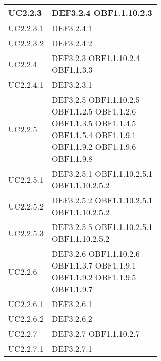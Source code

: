 \documentclass{scalatekids-article}
\begin{document}
\begin{longtable}[H]{|p{5.5cm}|p{5.5cm}|}
  \hline
  UC2.2.3 & \multiLineCell[t]{DEF3.2.4 OBF1.1.10.2.3\\}\\
  \hline
  UC2.2.3.1 & \multiLineCell[t]{DEF3.2.4.1\\}\\
  \hline
  UC2.2.3.2 & \multiLineCell[t]{DEF3.2.4.2\\}\\
  \hline
  UC2.2.4 & \multiLineCell[t]{DEF3.2.3 OBF1.1.10.2.4\\OBF1.1.3.3\\}\\
  \hline
  UC2.2.4.1 & \multiLineCell[t]{DEF3.2.3.1\\}\\
  \hline
  UC2.2.5 & \multiLineCell[t]{DEF3.2.5 OBF1.1.10.2.5\\OBF1.1.2.5 OBF1.1.2.6\\OBF1.1.3.5 OBF1.1.4.5\\OBF1.1.5.4 OBF1.1.9.1\\OBF1.1.9.2 OBF1.1.9.6\\OBF1.1.9.8}\\
  \hline
  UC2.2.5.1 & \multiLineCell[t]{DEF3.2.5.1 OBF1.1.10.2.5.1\\OBF1.1.10.2.5.2\\}\\
  \hline
  UC2.2.5.2 & \multiLineCell[t]{DEF3.2.5.2 OBF1.1.10.2.5.1\\OBF1.1.10.2.5.2\\}\\
  \hline
  UC2.2.5.3 & \multiLineCell[t]{DEF3.2.5.5 OBF1.1.10.2.5.1\\OBF1.1.10.2.5.2\\}\\
  \hline
  UC2.2.6 & \multiLineCell[t]{DEF3.2.6 OBF1.1.10.2.6\\OBF1.1.3.7 OBF1.1.9.1\\OBF1.1.9.2 OBF1.1.9.5\\OBF1.1.9.7}\\
  \hline
  UC2.2.6.1 & \multiLineCell[t]{DEF3.2.6.1\\}\\
  \hline
  UC2.2.6.2 & \multiLineCell[t]{DEF3.2.6.2\\}\\
  \hline
  UC2.2.7 & \multiLineCell[t]{DEF3.2.7 OBF1.1.10.2.7\\}\\
  \hline
  UC2.2.7.1 & \multiLineCell[t]{DEF3.2.7.1\\}\\

\end{longtable}
\end{document}
